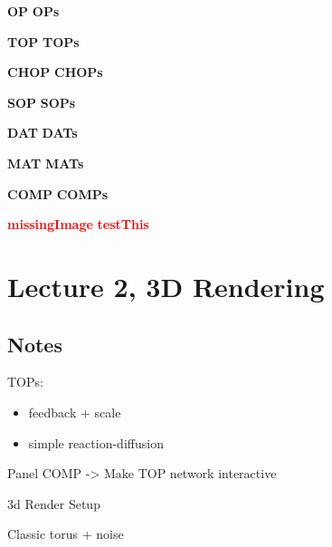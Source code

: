 \def\boldcommandlist{\@elt OP,\@elt OPs,}
\def\@elt#1,{%
 \expandafter\def\csname#1\endcsname{\textbf{#1}\xspace}
}
\boldcommandlist

\def\topColorList{\@elt TOP,\@elt TOPs,}
\def\@elt#1,{%
 \expandafter\def\csname#1\endcsname{\textcolor{TOP}{\textbf{#1}}\xspace}
}
\topColorList

\def\chopColorList{\@elt CHOP,\@elt CHOPs,}
\def\@elt#1,{%
 \expandafter\def\csname#1\endcsname{\textcolor{CHOP}{\textbf{#1}}\xspace}
}
\chopColorList

\def\sopColorList{\@elt SOP,\@elt SOPs,}
\def\@elt#1,{%
 \expandafter\def\csname#1\endcsname{\textcolor{SOP}{\textbf{#1}}\xspace}
}
\sopColorList

\def\datColorList{\@elt DAT,\@elt DATs,}
\def\@elt#1,{%
 \expandafter\def\csname#1\endcsname{\textcolor{DAT}{\textbf{#1}}\xspace}
}
\datColorList

\def\matColorList{\@elt MAT,\@elt MATs,}
\def\@elt#1,{%
 \expandafter\def\csname#1\endcsname{\textcolor{MAT}{\textbf{#1}}\xspace}
}
\matColorList


\def\compColorList{\@elt COMP,\@elt COMPs,}
\def\@elt#1,{%
 \expandafter\def\csname#1\endcsname{\textcolor{COMP}{\textbf{#1}}\xspace}
}
\compColorList

\def\redcommandlist{\@elt missingImage,\@elt testThis,}
\def\@elt#1,{%
 \expandafter\def\csname#1\endcsname{\textcolor{red}{\textbf{#1}}\xspace}
}
\redcommandlist


\chapter{Lecture 2, 3D Rendering}
\label{chap:3D_intro}

\section{Notes}
TOPs:\\
\begin{itemize}
  \item feedback + scale
  \item simple reaction-diffusion
\end{itemize}
Panel COMP -> Make TOP network interactive

3d Render Setup

Classic torus + noise

